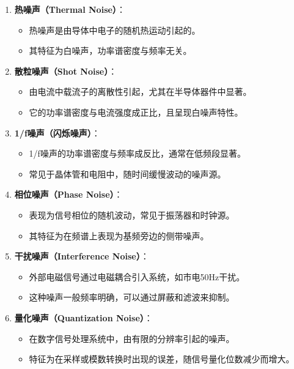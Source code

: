 \documentclass[dvipsnames, svgnames,a4paper,11pt]{article}
\begin{document}
	\begin{enumerate} 
		\item \textbf{热噪声（Thermal Noise）}： 
			\begin{itemize} 
				\item 热噪声是由导体中电子的随机热运动引起的。 
				\item 其特征为白噪声，功率谱密度与频率无关。 
			\end{itemize}

		\item \textbf{散粒噪声（Shot Noise）}：
			\begin{itemize}
				\item 由电流中载流子的离散性引起，尤其在半导体器件中显著。
				\item 它的功率谱密度与电流强度成正比，且呈现白噪声特性。
			\end{itemize}

		\item \textbf{1/f噪声（闪烁噪声）}：
			\begin{itemize}
				\item 1/f噪声的功率谱密度与频率成反比，通常在低频段显著。
				\item 常见于晶体管和电阻中，随时间缓慢波动的噪声源。
			\end{itemize}

		\item \textbf{相位噪声（Phase Noise）}：
			\begin{itemize}
				\item 表现为信号相位的随机波动，常见于振荡器和时钟源。
				\item 其特征为在频谱上表现为基频旁边的侧带噪声。
			\end{itemize}

		\item \textbf{干扰噪声（Interference Noise）}：
			\begin{itemize}
				\item 外部电磁信号通过电磁耦合引入系统，如市电50Hz干扰。
				\item 这种噪声一般频率明确，可以通过屏蔽和滤波来抑制。
			\end{itemize}

		\item \textbf{量化噪声（Quantization Noise）}：
			\begin{itemize}
				\item 在数字信号处理系统中，由有限的分辨率引起的噪声。
				\item 特征为在采样或模数转换时出现的误差，随信号量化位数减少而增大。
			\end{itemize}

	\end{enumerate}
\end{document}
